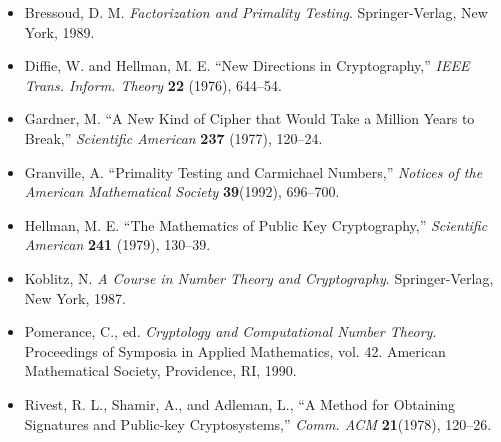 {\small
\begin{itemize}
 
\item[{\bf [1]}]
Bressoud, D. M. {\it Factorization and Primality Testing}.
Springer-Verlag, New York, 1989. 
 
\item[{\bf [2]}]
Diffie, W. and Hellman, M. E. ``New Directions in
Cryptography,'' {\it IEEE Trans. Inform. Theory} {\bf
22} (1976), 644--54.
 
\item[{\bf [3]}]
Gardner, M. ``A New Kind of Cipher that Would Take a Million
Years to Break,'' {\it Scientific American} {\bf
237} (1977), 120--24.
 
\item[{\bf [4]}]%
Granville, A. ``Primality Testing and Carmichael Numbers,'' {\it
Notices of the American Mathematical Society} {\bf 39}(1992),
696--700. 
 
 
 
\item[{\bf [5]}]
Hellman, M. E. ``The Mathematics of Public Key
Cryptography,''  {\it Scientific American} {\bf 241}
(1979), 130--39.
 
\item[{\bf [6]}]%
Koblitz, N. {\it A Course in Number Theory and Cryptography}.
Springer-Verlag, New York, 1987. 
 
 
\item[{\bf [7]}]
Pomerance, C., ed. {\it Cryptology and Computational Number
Theory}. Proceedings of Symposia in Applied Mathematics,
vol. 42. American Mathematical Society, Providence, RI,
1990.
 
 
\item[{\bf [8]}]
Rivest, R. L., Shamir, A., and Adleman, L., ``A Method for
Obtaining Signatures and Public-key Cryptosystems,'' {\it
Comm. ACM} {\bf 21}(1978), 120--26.
 
\end{itemize}
}